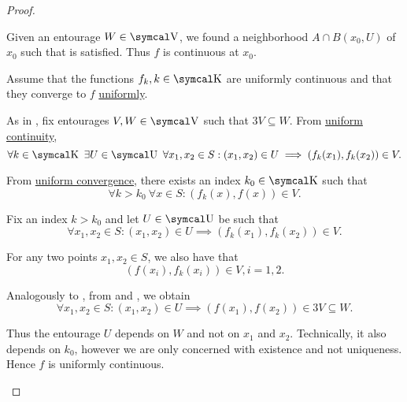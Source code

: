 \begin{proof}
\begin{RefList}
    Given an entourage \( W \in \CV \), we found a neighborhood \( A \cap B(x_0, U) \) of \( x_0 \) such that  is satisfied. Thus \( f \) is continuous at \( x_0 \).

     Assume that the functions \( f_k, k \in \CK \) are uniformly continuous and that they converge to \( f \) \hyperref[def:function_net_convergence/locally_uniform]{uniformly}.

    As in , fix entourages \( V, W \in \CV \) such that \( 3V \subseteq W \). From \hyperref[def:uniform_continuity]{uniform continuity},
    \begin{equation*}
      \forall k \in \CK \ \exists U \in \CU \ \forall x_1, x_2 \in S : (x_1, x_2) \in U \implies (f_k(x_1), f_k(x_2)) \in V.
    \end{equation*}

    From \hyperref[def:function_net_convergence]{uniform convergence}, there exists an index \( k_0 \in \CK \) such that
    \begin{equation*}
      \forall k > k_0 \ \forall x \in S : (f_k(x), f(x)) \in V.
    \end{equation*}

    Fix an index \( k > k_0 \) and let \( U \in \CU \) be such that
    \begin{equation}\label{def:uniform_limit_of_continuous_functions/uniform/continuity}
      \forall x_1, x_2 \in S : (x_1, x_2) \in U \implies (f_k(x_1), f_k(x_2)) \in V.
    \end{equation}

    For any two points \( x_1, x_2 \in S \), we also have that
    \begin{equation}\label{def:uniform_limit_of_continuous_functions/uniform/convergence}
      (f(x_i), f_k(x_i)) \in V, i = 1, 2.
    \end{equation}

    Analogously to , from  and , we obtain
    \begin{equation*}
      \forall x_1, x_2 \in S : (x_1, x_2) \in U \implies (f(x_1), f(x_2)) \in 3V \subseteq W.
    \end{equation*}

    Thus the entourage \( U \) depends on \( W \) and not on \( x_1 \) and \( x_2 \). Technically, it also depends on \( k_0 \), however we are only concerned with existence and not uniqueness. Hence \( f \) is uniformly continuous.
  \end{RefList}
\end{proof}

